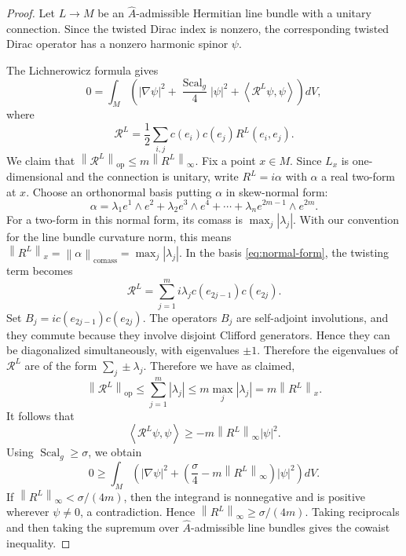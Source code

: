 \documentclass[10pt,a4paper]{amsart}
\newcommand{\Ah}{\widehat A}
\DeclareMathOperator{\Scal}{Scal}
\DeclareMathOperator{\comass}{comass}
\newcommand{\ip}[2]{\left\langle #1,#2\right\rangle}
\newcommand{\norm}[1]{\left\lVert #1\right\rVert}
\begin{document}
\begin{proof}
Let \(L\to M\) be an \(\Ah\)-admissible Hermitian line bundle with a unitary connection. Since the twisted Dirac index is nonzero, the corresponding twisted Dirac operator has a nonzero harmonic spinor \(\psi\).

The Lichnerowicz formula gives
\[
0
=
\int_M
\left(
|\nabla\psi|^2
+
\frac{\Scal_g}{4}|\psi|^2
+
\ip{\mathcal R^L\psi}{\psi}
\right)dV,
\]
where
\[
\mathcal R^L
=
\frac12
\sum_{i,j}c(e_i)c(e_j)R^L(e_i,e_j).
\]
We claim that \(\norm{\mathcal R^L}_{\operatorname{op}}\le m\norm{R^L}_\infty\). Fix a point $x\in M$. Since $L_x$ is one-dimensional and the connection is unitary, write $R^L=i\alpha$ with $\alpha$ a real two-form at $x$. Choose an orthonormal basis putting $\alpha$ in skew-normal form:
\begin{equation}\label{eq:normal-form}
\alpha
=
\lambda_1 e^1\wedge e^2
+
\lambda_2 e^3\wedge e^4
+
\cdots+
\lambda_n e^{2m-1}\wedge e^{2m}.
\end{equation}
For a two-form in this normal form, its comass is $\max_j |\lambda_j|$. With our convention for the line bundle curvature norm, this means\( \norm{R^L}_x=\norm{\alpha}_{\comass}=\max_j|\lambda_j|.\)
In the basis \eqref{eq:normal-form}, the twisting term becomes
\begin{equation*}
\mathcal R^L
=
\sum_{j=1}^m i\lambda_j c(e_{2j-1})c(e_{2j}).
\end{equation*}
Set $B_j=i c(e_{2j-1})c(e_{2j})$. The operators $B_j$ are self-adjoint involutions, and they commute because they involve disjoint Clifford generators. Hence they can be diagonalized simultaneously, with eigenvalues $\pm1$. Therefore the eigenvalues of $\mathcal R^L$ are of the form $\sum_j \pm \lambda_j$. Therefore we have as claimed,
\begin{equation}\label{eq:op-norm-bound}
\norm{\mathcal R^L}_{\operatorname{op}}
\le
\sum_{j=1}^m |\lambda_j|
\le
m\max_j|\lambda_j|
=
m\norm{R^L}_x.
\end{equation}
It follows that
\[
\ip{\mathcal R^L\psi}{\psi}
\ge
-m\norm{R^L}_\infty|\psi|^2.
\]
Using \(\Scal_g\ge\sigma\), we obtain
\[
0
\ge
\int_M
\left(
|\nabla \psi|^2
+
\left(\frac{\sigma}{4}-m\norm{R^L}_\infty\right)
|\psi|^2
\right)dV.
\]
If \(\norm{R^L}_\infty<\sigma/(4m)\), then the integrand is nonnegative and is positive wherever \(\psi\neq0\), a contradiction. Hence \(\norm{R^L}_\infty\ge\sigma/(4m)\). Taking reciprocals and then taking the supremum over \(\Ah\)-admissible line bundles gives the cowaist inequality.
\end{proof}
\end{document}
